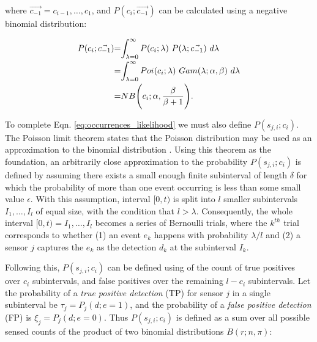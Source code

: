 \noindent where $\vec{c_{-1}} = c_{i-1}, \ldots, c_1$, and $P(c_i ; \vec{c_{-1}})$ can be calculated using a negative binomial distribution:

\begin{equation}
	\label{eq:unconditional_xi}
	\begin{tabular}{r@{=}l}
		$P(c_i ; \vec{c_{-1}})$ & $\displaystyle\int_{\lambda=0}^{\infty} P(c_i ; \lambda) ~ P(\lambda ; \vec{c_{-1}}) ~d\lambda$ \\ [2ex]
		& $\displaystyle\int_{\lambda=0}^{\infty} Poi(c_i ; \lambda) ~ Gam(\lambda ; \alpha, \beta) ~d\lambda$ \\ [2ex]
		& $NB\Bigg(c_i ; \alpha, \displaystyle\frac{\beta}{\beta + 1}\Bigg)$.
	\end{tabular}
\end{equation}

To complete Eqn. \ref{eq:occurrences_likelihood} we must also define $P(s_{j,i} ; c_i)$. The Poisson limit theorem states that the Poisson distribution may be used as an approximation to the binomial distribution \cite{papoulis2002probability}. Using this theorem as the foundation, an arbitrarily close approximation to the probability $P(s_{j,i} ; c_i)$ is defined by assuming there exists a small enough finite subinterval of length $\delta$ for which the probability of more than one event occurring is less than some small value $ \epsilon$. With this assumption, interval $[0, t)$ is split into $l$ smaller subintervals $I_1, \ldots, I_l$ of equal size, with the condition that $l > \lambda$. Consequently, the whole interval $[0, t) = I_1, \ldots, I_l$ becomes a series of Bernoulli trials, where the $k^{th}$ trial corresponds to whether (1) an event $e_k$ happens with probability $\lambda / l$ and (2) a sensor $j$ captures the $e_k$ as the detection $d_k$ at the subinterval $I_k$.

Following this, $P(s_{j,i} ; c_i)$ can be defined using of the count of true  positives over $c_i$ subintervals, and false positives over the remaining $l-c_i$ subintervals. 
% 
Let the probability of a \textit{true positive detection} (TP) for sensor $j$ in a single subinterval be $\tau_j = P_j(d;e=1)$, and the probability of a \textit{false positive detection} (FP) is $\xi_j = P_j(d;e=0)$. Thus $P(s_{j,i} ; c_i)$ is defined as a sum over all possible sensed counts of the product of two binomial distributions $B(r ; n,\pi)$: 

